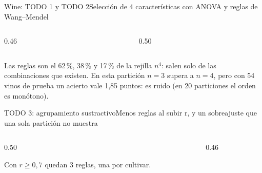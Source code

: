 \documentclass[aspectratio=169,10pt]{beamer}
\newcommand{\txt}[1]{{\fontsize{7.3pt}{9pt}\selectfont #1\par}}
\begin{document}
\begin{frame}{Wine: TODO 1 y TODO 2}{Selección de 4 características con ANOVA y reglas de Wang--Mendel}
  \begin{columns}[T,onlytextwidth]
    \begin{column}{0.46\textwidth}
    \end{column}
    \begin{column}{0.50\textwidth}
    \end{column}
  \end{columns}
  \vspace{0.2cm}
  \txt{Las reglas son el 62\,\%, 38\,\% y 17\,\% de la rejilla $n^4$: salen solo de las combinaciones que existen. En esta partición $n=3$ supera a $n=4$, pero con 54 vinos de prueba un acierto vale 1,85 puntos: es ruido (en 20 particiones el orden es monótono).}
\end{frame}

\begin{frame}{TODO 3: agrupamiento sustractivo}{Menos reglas al subir r, y un sobreajuste que una sola partición no muestra}
  \begin{columns}[T,onlytextwidth]
    \begin{column}{0.50\textwidth}
      \vspace{0.1cm}
      \txt{Con $r\ge0{,}7$ quedan 3 reglas, una por cultivar.}
    \end{column}
    \begin{column}{0.46\textwidth}
    \end{column}
  \end{columns}
\end{frame}
\end{document}
